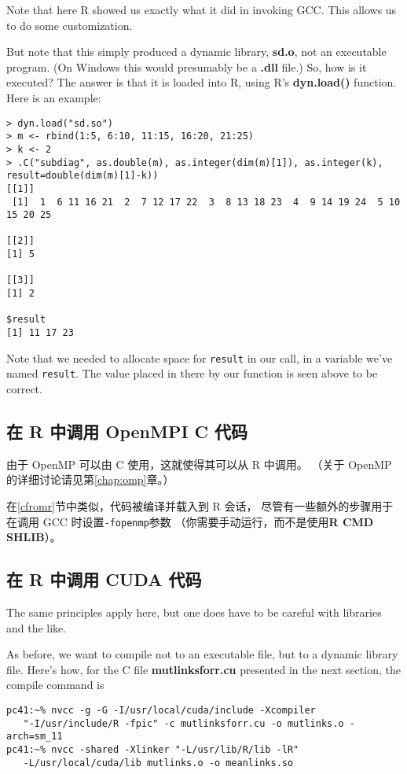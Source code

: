 Note that here R showed us exactly what it did in invoking GCC.  This
allows us to do some customization.

But note that this simply produced a dynamic library, {\bf sd.o}, not an
executable program.  (On Windows this would presumably be a {\bf .dll}
file.)  So, how is it executed?  The answer is that it is loaded into R,
using R's {\bf dyn.load()} function.  Here is an example:

\begin{lstlisting}
> dyn.load("sd.so")
> m <- rbind(1:5, 6:10, 11:15, 16:20, 21:25)
> k <- 2
> .C("subdiag", as.double(m), as.integer(dim(m)[1]), as.integer(k),
result=double(dim(m)[1]-k))
[[1]]
 [1]  1  6 11 16 21  2  7 12 17 22  3  8 13 18 23  4  9 14 19 24  5 10 15 20 25

[[2]]
[1] 5

[[3]]
[1] 2

$result
[1] 11 17 23
\end{lstlisting}

Note that we needed to allocate space for {\tt result} in our call, in a
variable we've named {\tt result}.  The value placed in there by our
function is seen above to be correct.

\subsection{在 R 中调用 OpenMPI C 代码}

由于 OpenMP 可以由 C 使用，这就使得其可以从 R 中调用。
（关于 OpenMP 的详细讨论请见第\ref{chap:omp}章。）

在\ref{cfromr}节中类似，代码被编译并载入到 R 会话，
尽管有一些额外的步骤用于在调用 GCC 时设置{\tt -fopenmp}参数
（你需要手动运行，而不是使用{\bf R CMD SHLIB}）。

\subsection{在 R 中调用 CUDA 代码}

The same principles apply here, but one does have to be careful with
libraries and the like.

As before, we want to compile not to an executable file, but to a dynamic
library file.  Here's how, for the C file {\bf mutlinksforr.cu}
presented in the next section, the compile command is

\begin{lstlisting}
pc41:~% nvcc -g -G -I/usr/local/cuda/include -Xcompiler
   "-I/usr/include/R -fpic" -c mutlinksforr.cu -o mutlinks.o -arch=sm_11
pc41:~% nvcc -shared -Xlinker "-L/usr/lib/R/lib -lR"
   -L/usr/local/cuda/lib mutlinks.o -o meanlinks.so
\end{lstlisting}

